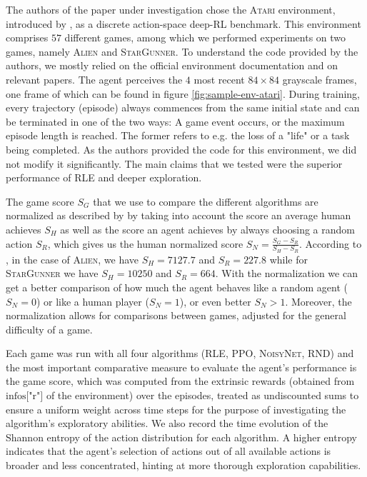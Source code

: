 \documentclass[10pt]{article} %
\begin{document}
The authors of the paper under investigation chose the \textsc{Atari} environment, introduced by \cite{atari-introduction}, as a discrete action-space deep-RL benchmark. This environment comprises $57$ different games, among which we performed experiments on two games, namely \textsc{Alien} and \textsc{StarGunner}. To understand the code provided by the authors, we mostly relied on the official environment documentation and on relevant papers. The agent perceives the $4$ most recent $84\times84$ grayscale frames, one frame of which can be found in figure \ref{fig:sample-env-atari}. During training, every trajectory (episode) always commences from the same initial state and can be terminated in one of the two ways: A game event occurs, or the maximum episode length is reached. The former refers to e.g. the loss of a "life" or a task being completed. As the authors provided the code for this environment, we did not modify it significantly. The main claims that we tested were the superior performance of \textsc{RLE} and deeper exploration.

\noindent The game score $S_{G}$ that we use to compare the different algorithms are normalized as described by \cite{agent57} by taking into account the score an average human achieves $S_{H}$ as well as the score an agent achieves by always choosing a random action $S_{R}$, which gives us the human normalized score $S_{N} = \frac{S_{G} - S_{R}}{S_{H} - S_{R}}$. According to \cite{agent57}, in the case of \textsc{Alien}, we have $S_{H} = 7127.7$ and $S_{R} = 227.8$ while for \textsc{StarGunner} we have $S_{H} = 10250$ and $S_{R} = 664$. With the normalization we can get a better comparison of how much the agent behaves like a random agent ($S_{N} = 0$) or like a human player ($S_{N} = 1$), or even better $S_{N} > 1$. Moreover, the normalization allows for comparisons between games, adjusted for the general difficulty of a game.

\noindent Each game was run with all four algorithms (\textsc{RLE}, \textsc{PPO}, \textsc{NoisyNet}, \textsc{RND}) and the most important comparative measure to evaluate the agent's performance is the game score, which was computed from the extrinsic rewards (obtained from $\text{infos["r"]}$ of the environment) over the episodes, treated as undiscounted sums to ensure a uniform weight across time steps for the purpose of investigating the algorithm's exploratory abilities. We also record the time evolution of the Shannon entropy of the action distribution for each algorithm. A higher entropy indicates that the agent's selection of actions out of all available actions is broader and less concentrated, hinting at more thorough exploration capabilities.
\end{document}
